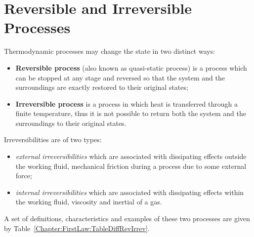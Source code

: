    \section{Reversible and Irreversible Processes}\label{Chapter:FirstLaw:Section:Reversibility}
   Thermodynamic processes may change the state in two distinct ways:
   \begin{itemize}
     \item {\bf Reversible process} (also known as quasi-static process) is a process which can be stopped at any stage and reversed so that the system and the surroundings are exactly restored to their original states;
     \item {\bf Irreversible process} is a process in which heat is transferred through a finite temperature, thus it is not possible to return both the system and the surroundings to their original states.
   \end{itemize}
   Irreversibilities are of two types:
   \begin{itemize}
      \item {\it external irreversibilities} which are associated with dissipating effects outside the working fluid, \eg mechanical friction during a process due to some external force;
      \item {\it internal irreversibilities} which are associated with dissipating effects within the working fluid, \eg viscosity and inertial of a gas.
   \end{itemize}
   A set of definitions, characteristics and examples of these two processes are given by Table~\ref{Chapter:FirstLaw:TableDiffRevIrrev}. 
   
   
